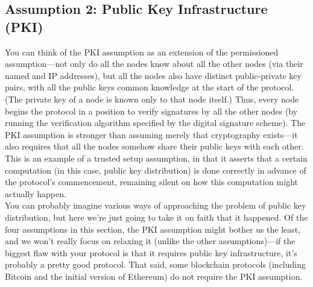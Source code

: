 \subsection{Assumption 2: Public Key Infrastructure (PKI)}
You can think of the PKI assumption as an extension of the permissioned assumption—not
only do all the nodes know about all the other nodes (via their named and IP addresses),
but all the nodes also have distinct public-private key pairs, with all the public keys common
knowledge at the start of the protocol. (The private key of a node is known only to that
node itself.) Thus, every node begins the protocol in a position to verify signatures by all the
other nodes (by running the verification algorithm specified by the digital signature scheme).
The PKI assumption is stronger than assuming merely that cryptography exists—it also
requires that all the nodes somehow share their public keys with each other. This is an
example of a trusted setup assumption, in that it asserts that a certain computation (in this
case, public key distribution) is done correctly in advance of the protocol’s commencement,
remaining silent on how this computation might actually happen.\\
You can probably imagine various ways of approaching the problem of public key distribution, but here we’re just going to take it on faith that it happened. Of the four assumptions
in this section, the PKI assumption might bother us the least, and we won’t really focus
on relaxing it (unlike the other assumptions)—if the biggest flaw with your protocol is that
it requires public key infrastructure, it’s probably a pretty good protocol. That said, some
blockchain protocols (including Bitcoin and the initial version of Ethereum) do not require
the PKI assumption.

